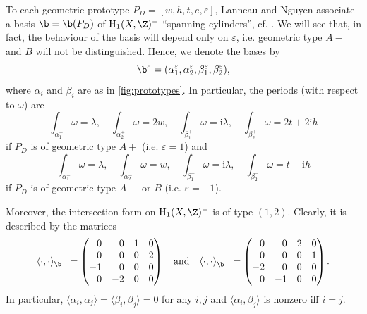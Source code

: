 \documentclass{amsart}
\makeatletter
\newcommand*{\@gobblenexttocentry}[9]{}
\newcommand*{\@gobblenexttocentry}[4]{}
\newcommand*{\addsubsection}{%
    \addtocontents{toc}{\protect\@gobblenexttocentry}%
    \subsection*}
\renewcommand{\i}{\mathrm{i}}
\renewcommand{\H}%
{\mathrm{H}}
\def\ep{\varepsilon}
\makeatother
\begin{document}

To each geometric prototype $P_D=[w,h,t,e,\ep]$, Lanneau and Nguyen associate a basis $\b=\b(P_D)$ of $\H_1(X,\Z)^-$ \enquote{spanning cylinders}, cf. \cite[\S 4]{lanneaunguyen}. We will see that, in fact, the behaviour of the basis will depend only on $\ep$, i.e. geometric type $A-$ and $B$ will not be distinguished. Hence, we denote the bases by 
\[\b^\ep=(\alpha^\ep_1,\alpha^\ep_2,\beta^\ep_1,\beta^\ep_2),\]
where $\alpha_i$ and $\beta_i$ are as in \autoref{fig:prototypes}. In particular, the periods (with respect to $\omega$) are
\begin{equation}\label{periods+}
\int_{\alpha^+_1}\omega=\lambda,\quad\int_{\alpha^+_2}\omega=2w,\quad\int_{\beta^+_1}\omega=\i\lambda,\quad\int_{\beta^+_2}\omega=2t+2\i h
\end{equation}
if $P_D$ is of geometric type $A+$ (i.e. $\ep=1$) and
\begin{equation}\label{periods-}
\int_{\alpha^-_1}\omega=\lambda,\quad\int_{\alpha^-_2}\omega=w,\quad\int_{\beta^-_1}\omega=\i\lambda,\quad\int_{\beta^-_2}\omega=t+\i h
\end{equation}
if $P_D$ is of geometric type $A-$ or $B$ (i.e. $\ep=-1$).

Moreover, the intersection form on $\H_1(X,\Z)^-$ is of type $(1,2)$. Clearly, it is described by the matrices
\begin{equation}\label{intersectionmatrix}
\langle\cdot,\cdot\rangle_{\b^+}=\begin{pmatrix}\phantom{-}0&\phantom{-}0&1&0\\\phantom{-}0&\phantom{-}0&0&2\\-1&\phantom{-}0&0&0\\\phantom{-}0&-2&0&0\end{pmatrix}
\quad\text{and}\quad
\langle\cdot,\cdot\rangle_{\b^-}=\begin{pmatrix}\phantom{-}0&\phantom{-}0&2&0\\\phantom{-}0&\phantom{-}0&0&1\\-2&\phantom{-}0&0&0\\\phantom{-}0&-1&0&0\end{pmatrix}.
\end{equation}
In particular, $\langle\alpha_i,\alpha_j\rangle=\langle\beta_i,\beta_j\rangle=0$ for any $i,j$ and $\langle\alpha_i,\beta_j\rangle$ is nonzero iff $i=j$.


\end{document}
